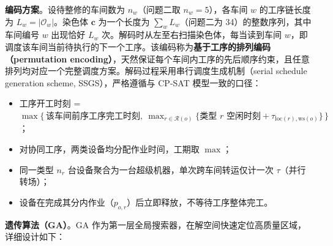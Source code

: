 \documentclass[12pt,a4paper]{ctexart}
\begin{document}
\textbf{编码方案}。设待整修的车间数为 $n_w$（问题二取 $n_w=5$），各车间 $w$ 的工序链长度为 $L_w=|\mathcal{O}_w|$。染色体 $\mathbf{c}$ 为一个长度为 $\sum_w L_w$（问题二为 34）的整数序列，其中车间编号 $w$ 出现恰好 $L_w$ 次。解码时从左至右扫描染色体，每当读到车间 $w$，即调度该车间当前待执行的下一个工序。该编码称为\textbf{基于工序的排列编码（permutation encoding）}，天然保证每个车间内工序的先后顺序约束，且任意排列均对应一个完整调度方案。解码过程采用串行调度生成机制（serial schedule generation scheme, SSGS），严格遵循与 CP-SAT 模型一致的口径：
\begin{itemize}
\item 工序开工时刻 = $\max\{\,\text{该车间前序工序完工时刻},\ \max_{r\in\mathcal{R}(o)}\{\text{类型 }r\text{ 空闲时刻} + \tau_{\text{loc}(r),\text{ws}(o)}\}\,\}$；
\item 对协同工序，两类设备均分配作业时间，工期取 $\max$；
\item 同一类型 $n_r$ 台设备聚合为一台超级机器，单次跨车间转运仅计一次 $\tau$（并行转场）；
\item 设备在完成其分内作业（$p_{o,r}$）后立即释放，不等待工序整体完工。
\end{itemize}

\medskip
\noindent\textbf{遗传算法（GA）}。GA 作为第一层全局搜索器，在解空间快速定位高质量区域，详细设计如下：
\end{document}
